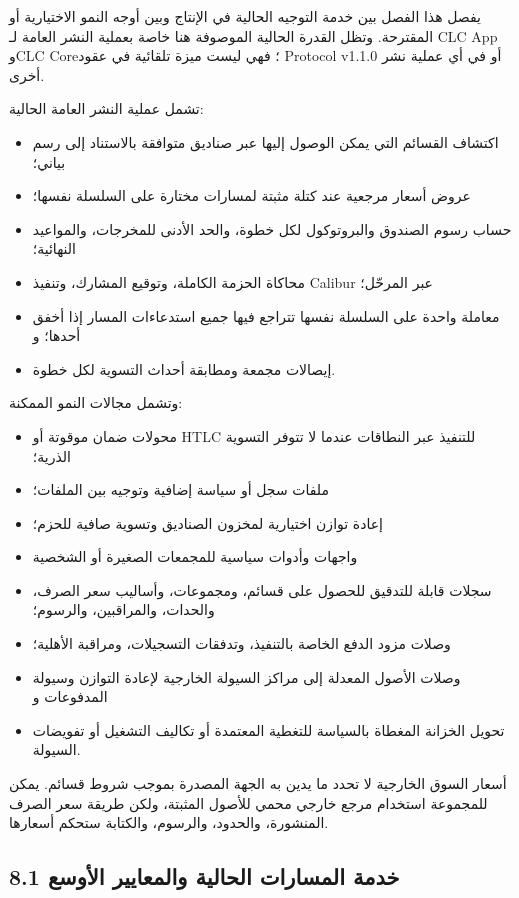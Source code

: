 \documentclass[11pt]{article}
\begin{document}
يفصل هذا الفصل بين خدمة التوجيه الحالية في الإنتاج وبين أوجه النمو الاختيارية أو المقترحة. وتظل القدرة الحالية الموصوفة هنا خاصة بعملية النشر العامة لـ CLC App وCLC Core؛ فهي ليست ميزة تلقائية في عقود Protocol v1.1.0 أو في أي عملية نشر أخرى.

تشمل عملية النشر العامة الحالية:

\begin{itemize}[leftmargin=*]
\item اكتشاف القسائم التي يمكن الوصول إليها عبر صناديق متوافقة بالاستناد إلى رسم بياني؛
\item عروض أسعار مرجعية عند كتلة مثبتة لمسارات مختارة على السلسلة نفسها؛
\item حساب رسوم الصندوق والبروتوكول لكل خطوة، والحد الأدنى للمخرجات، والمواعيد النهائية؛
\item محاكاة الحزمة الكاملة، وتوقيع المشارك، وتنفيذ Calibur عبر المرحّل؛
\item معاملة واحدة على السلسلة نفسها تتراجع فيها جميع استدعاءات المسار إذا أخفق أحدها؛ و
\item إيصالات مجمعة ومطابقة أحداث التسوية لكل خطوة.
\end{itemize}
وتشمل مجالات النمو الممكنة:

\begin{itemize}[leftmargin=*]
\item محولات ضمان موقوتة أو HTLC للتنفيذ عبر النطاقات عندما لا تتوفر التسوية الذرية؛
\item ملفات سجل أو سياسة إضافية وتوجيه بين الملفات؛
\item إعادة توازن اختيارية لمخزون الصناديق وتسوية صافية للحزم؛
\item واجهات وأدوات سياسية للمجمعات الصغيرة أو الشخصية
\item سجلات قابلة للتدقيق للحصول على قسائم، ومجموعات، وأساليب سعر الصرف، والحدات، والمراقبين، والرسوم؛
\item وصلات مزود الدفع الخاصة بالتنفيذ، وتدفقات التسجيلات، ومراقبة الأهلية؛
\item وصلات الأصول المعدلة إلى مراكز السيولة الخارجية لإعادة التوازن وسيولة المدفوعات و
\item تحويل الخزانة المغطاة بالسياسة للتغطية المعتمدة أو تكاليف التشغيل أو تفويضات السيولة.
\end{itemize}
أسعار السوق الخارجية لا تحدد ما يدين به الجهة المصدرة بموجب شروط قسائم. يمكن للمجموعة استخدام مرجع خارجي محمي للأصول المثبتة، ولكن طريقة سعر الصرف المنشورة، والحدود، والرسوم، والكتابة ستحكم أسعارها.

\subsection*{8.1 خدمة المسارات الحالية والمعايير الأوسع}
\end{document}
